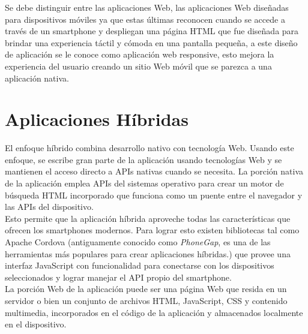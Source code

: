   Se debe distinguir entre las aplicaciones Web, las aplicaciones Web diseñadas para dispositivos móviles ya que estas últimas reconocen cuando se accede a través de un smartphone y despliegan una página HTML que fue diseñada para brindar una experiencia táctil y cómoda en una pantalla pequeña, a este diseño de aplicación se le conoce como aplicación web responsive, esto mejora la experiencia del usuario creando un sitio Web móvil que se parezca a una aplicación nativa.\\


  \section{Aplicaciones Híbridas}
  \label{sec:aplicaciones_hibridas}

    El enfoque híbrido combina desarrollo nativo con tecnología Web. Usando este enfoque, se escribe gran parte de la aplicación usando tecnologías Web y se mantienen el acceso directo a APIs nativas cuando se necesita. La porción nativa de la aplicación emplea APIs del sistemas operativo para crear un motor de búsqueda HTML incorporado que funciona como un puente entre el navegador y las APIs del dispositivo\cite{IBM_Mobile}.\\

    Esto permite que la aplicación híbrida aproveche todas las características que ofrecen los smartphones modernos. Para lograr esto existen bibliotecas tal como Apache Cordova (antiguamente conocido como \emph{PhoneGap}, es una de las herramientas más populares para crear aplicaciones híbridas.) que provee una interfaz JavaScript con funcionalidad para conectarse con los dispositivos seleccionados y lograr manejar el API propio del smartphone.\\

    La porción Web de la aplicación puede ser una página Web que resida en un servidor o bien un conjunto de archivos HTML, JavaScript, CSS y contenido multimedia, incorporados en el código de la aplicación y almacenados localmente en el dispositivo\cite{IBM_Mobile}.\\



